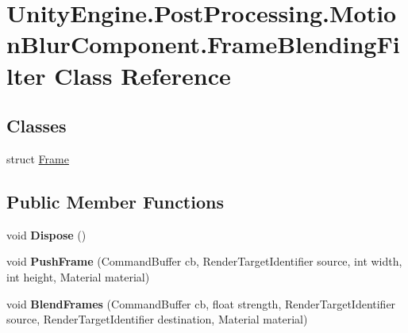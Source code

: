 \hypertarget{class_unity_engine_1_1_post_processing_1_1_motion_blur_component_1_1_frame_blending_filter}{}\section{Unity\+Engine.\+Post\+Processing.\+Motion\+Blur\+Component.\+Frame\+Blending\+Filter Class Reference}
\label{class_unity_engine_1_1_post_processing_1_1_motion_blur_component_1_1_frame_blending_filter}
\subsection*{Classes}
\begin{DoxyCompactItemize}
\item 
struct \hyperlink{struct_unity_engine_1_1_post_processing_1_1_motion_blur_component_1_1_frame_blending_filter_1_1_frame}{Frame}
\end{DoxyCompactItemize}
\subsection*{Public Member Functions}
\begin{DoxyCompactItemize}
\item 
\mbox{\label{class_unity_engine_1_1_post_processing_1_1_motion_blur_component_1_1_frame_blending_filter_a65d54ba8a2c251750ae6f0b24b820dea}} 
void {\bfseries Dispose} ()
\item 
\mbox{\label{class_unity_engine_1_1_post_processing_1_1_motion_blur_component_1_1_frame_blending_filter_a28f61022ba58cd83c34e46a2511c32ed}} 
void {\bfseries Push\+Frame} (Command\+Buffer cb, Render\+Target\+Identifier source, int width, int height, Material material)
\item 
\mbox{\label{class_unity_engine_1_1_post_processing_1_1_motion_blur_component_1_1_frame_blending_filter_a679383bc1fc3e5e698bb5724676efcc5}} 
void {\bfseries Blend\+Frames} (Command\+Buffer cb, float strength, Render\+Target\+Identifier source, Render\+Target\+Identifier destination, Material material)
\end{DoxyCompactItemize}
